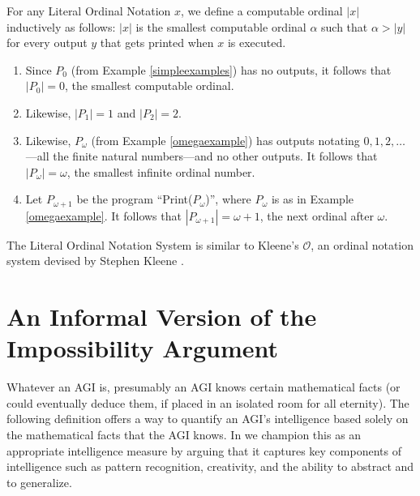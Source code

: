 \documentclass[runningheads]{llncs}
\begin{document}
\begin{definition}
    For any Literal Ordinal Notation $x$, we define a computable ordinal $|x|$
    inductively as follows: $|x|$ is the smallest computable ordinal $\alpha$
    such that $\alpha>|y|$ for every output $y$ that gets printed when $x$ is
    executed.
\end{definition}

\begin{example}
    \begin{enumerate}
        \item
        Since $P_0$ (from Example \ref{simpleexamples}) has no outputs,
        it follows that $|P_0|=0$, the smallest computable ordinal.
        \item
        Likewise, $|P_1|=1$ and $|P_2|=2$.
        \item
        Likewise, $P_\omega$ (from Example \ref{omegaexample}) has outputs
        notating $0, 1, 2, \ldots$---all the finite natural numbers---and no
        other outputs. It follows that $|P_\omega|=\omega$, the smallest
        infinite ordinal number.
        \item
        Let $P_{\omega+1}$ be the program ``Print($P_\omega$)'',
        where $P_\omega$ is as in Example \ref{omegaexample}.
        It follows that $|P_{\omega+1}|=\omega+1$, the next ordinal after
        $\omega$.
    \end{enumerate}
\end{example}

The Literal Ordinal Notation System is similar to Kleene's $\mathcal O$,
an ordinal notation system devised by Stephen Kleene \cite{kleene}.

\section{An Informal Version of the Impossibility Argument}
\label{informalargumentsection}

Whatever an AGI is, presumably an AGI knows certain mathematical facts
(or could eventually deduce them, if placed in an isolated room for all eternity).
The following definition offers a way to quantify an AGI's intelligence based
solely on the mathematical facts that the AGI knows. In \cite{alexander2019measuring}
we champion this as an appropriate intelligence measure by arguing that it
captures key components of intelligence such as pattern recognition, creativity, and
the ability to abstract and to generalize.
\end{document}
